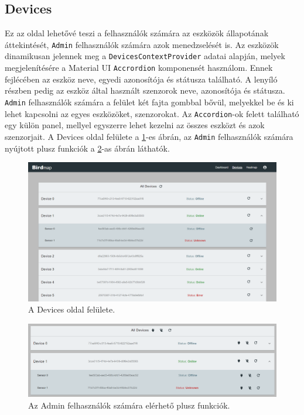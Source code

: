 \subsection{Devices}
Ez az oldal lehetővé teszi a felhasználók számára az eszközök állapotának áttekintését, \verb+Admin+ felhasználók számára azok menedzselését is.
Az eszközök dinamikusan jelennek meg a \verb+DevicesContextProvider+ adatai alapján, melyek megjelenítésére a Material UI \verb+Accrordion+ komponensét használom.
Ennek fejlécében az eszköz neve, egyedi azonosítója és státusza található. A lenyíló részben pedig az eszköz által használt szenzorok neve, azonosítója és státusza.
\verb+Admin+ felhasználók számára a felület két fajta gombbal bővül, melyekkel be és ki lehet kapcsolni az egyes eszközöket, szenzorokat.
Az \verb+Accordion+-ok felett található egy külön panel, mellyel egyszerre lehet kezelni az összes eszközt és azok szenzorjait.
A Devices oldal felülete a \ref{fig:frontend-devices}-es ábrán,
az \verb+Admin+ felhasználók számára nyújtott plusz funkciók a \ref{fig:frontend-devices-admin}-as ábrán láthatók.
\begin{figure}[!ht]
    \centering
    \includegraphics[width=150mm, keepaspectratio]{figures/devices.png}
    \caption{A Devices oldal felülete.}
    \label{fig:frontend-devices}
\end{figure}
\begin{figure}[!ht]
    \centering
    \includegraphics[width=150mm, keepaspectratio]{figures/devices-admin.png}
    \caption{Az Admin felhasználók számára elérhető plusz funkciók.}
    \label{fig:frontend-devices-admin}
\end{figure}
